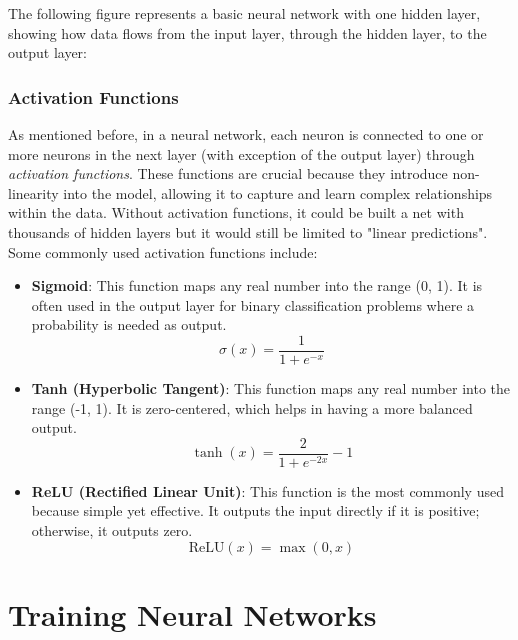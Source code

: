 \documentclass[../Thesis.tex]{subfiles}
\begin{document}
	The following figure represents a basic neural network with one hidden layer, showing how data flows from the input layer, through the hidden layer, to the output layer:
	
	
	\subsubsection{Activation Functions}

	As mentioned before, in a neural network, each neuron is connected to one or more neurons in the next layer (with exception of the output layer) through \emph{activation functions}. These functions are crucial because they introduce non-linearity into the model, allowing it to capture and learn complex relationships within the data. Without activation functions, it could be built a net with thousands of hidden layers but it would still be limited to "linear predictions". Some commonly used activation functions include:
	
	\begin{itemize}
		\item \textbf{Sigmoid}: This function maps any real number into the range (0, 1). It is often used in the output layer for binary classification problems where a probability is needed as output.
		\[
		\sigma(x) = \frac{1}{1 + e^{-x}}
		\]
		\item \textbf{Tanh (Hyperbolic Tangent)}: This function maps any real number into the range (-1, 1). It is zero-centered, which helps in having a more balanced output.
		\[
		\tanh(x) = \frac{2}{1 + e^{-2x}} - 1
		\]
		\item \textbf{ReLU (Rectified Linear Unit)}: This function is the most commonly used because simple yet effective. It outputs the input directly if it is positive; otherwise, it outputs zero.
		\[
		\text{ReLU}(x) = \max(0, x)
		\]
	\end{itemize}
	
\section{Training Neural Networks}
\end{document}
